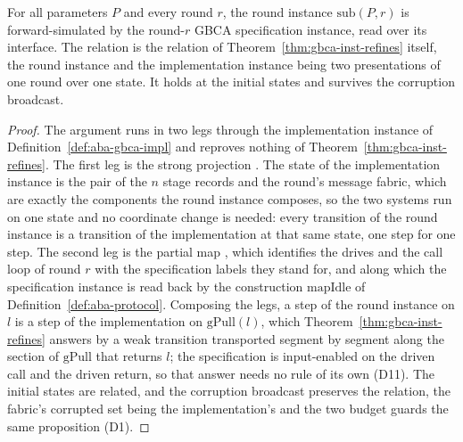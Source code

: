 \begin{theorem}
  \label{thm:aba-subsim}
  \leanok
  For all parameters $P$ and every round $r$, the round instance $\mathrm{sub}(P,r)$ is forward-simulated by the round-$r$ GBCA specification instance, read over its interface.
  The relation is the relation of Theorem~\ref{thm:gbca-inst-refines} itself, the round instance and the implementation instance being two presentations of one round over one state.
  It holds at the initial states and survives the corruption broadcast.
\end{theorem}

\begin{proof}\leanok
  The argument runs in two legs through the implementation instance of Definition~\ref{def:aba-gbca-impl} and reproves nothing of Theorem~\ref{thm:gbca-inst-refines}.
  The first leg is the strong projection .
  The state of the implementation instance is the pair of the $n$ stage records and the round's message fabric, which are exactly the components the round instance composes, so the two systems run on one state and no coordinate change is needed: every transition of the round instance is a transition of the implementation at that same state, one step for one step.
  The second leg is the partial map , which identifies the drives and the call loop of round $r$ with the specification labels they stand for, and along which the specification instance is read back by the construction $\mathrm{mapIdle}$ of Definition~\ref{def:aba-protocol}.
  Composing the legs, a step of the round instance on $l$ is a step of the implementation on $\mathrm{gPull}(l)$, which Theorem~\ref{thm:gbca-inst-refines} answers by a weak transition transported segment by segment along the section of $\mathrm{gPull}$ that returns $l$; the specification is input-enabled on the driven call and the driven return, so that answer needs no rule of its own (D11).
  The initial states are related, and the corruption broadcast preserves the relation, the fabric's corrupted set being the implementation's and the two budget guards the same proposition (D1).
\end{proof}
